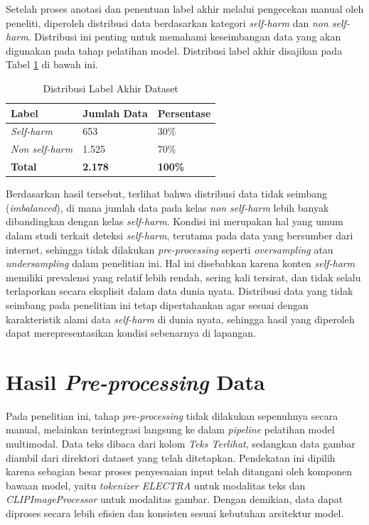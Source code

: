Setelah proses anotasi dan penentuan label akhir melalui pengecekan manual oleh peneliti, diperoleh distribusi data berdasarkan kategori \textit{self-harm} dan \textit{non self-harm}. Distribusi ini penting untuk memahami keseimbangan data yang akan digunakan pada tahap pelatihan model. Distribusi label akhir disajikan pada Tabel \ref{table:4.distribusi_label} di bawah ini.

\begin{table}[H]
    \centering
    \caption{Distribusi Label Akhir Dataset}
    \label{table:4.distribusi_label}
    \small
    \setlength{\tabcolsep}{3pt}
    \renewcommand{\arraystretch}{1.1}
    \begin{tabular}{p{4.5cm} p{3.5cm} p{3.5cm}}
        \hline
        \textbf{Label} & \textbf{Jumlah Data} & \textbf{Persentase} \\
        \hline
        \textit{Self-harm} & 653 & 30\% \\
        \textit{Non self-harm} & 1.525 & 70\% \\
        \textbf{Total} & \textbf{2.178} & \textbf{100\%} \\
        \hline
    \end{tabular}
\end{table}

Berdasarkan hasil tersebut, terlihat bahwa distribusi data tidak seimbang (\textit{imbalanced}), di mana jumlah data pada kelas \textit{non self-harm} lebih banyak dibandingkan dengan kelas \textit{self-harm}. Kondisi ini merupakan hal yang umum dalam studi terkait deteksi \textit{self-harm}, terutama pada data yang bersumber dari internet, sehingga tidak dilakukan \textit{pre-processing} seperti \textit{oversampling} atau \textit{undersampling} dalam penelitian ini. Hal ini disebabkan karena konten \textit{self-harm} memiliki prevalensi yang relatif lebih rendah, sering kali tersirat, dan tidak selalu terlaporkan secara eksplisit dalam data dunia nyata. Distribusi data yang tidak seimbang pada penelitian ini tetap dipertahankan agar sesuai dengan karakteristik alami data \textit{self-harm} di dunia nyata, sehingga hasil yang diperoleh dapat merepresentasikan kondisi sebenarnya di lapangan.

\section{Hasil \textit{Pre-processing} Data} \label{IV.Preprocessing}
Pada penelitian ini, tahap \textit{pre-processing} tidak dilakukan sepenuhnya secara manual, melainkan terintegrasi langsung ke dalam \textit{pipeline} pelatihan model multimodal. Data teks dibaca dari kolom \textit{Teks Terlihat}, sedangkan data gambar diambil dari direktori dataset yang telah ditetapkan. Pendekatan ini dipilih karena sebagian besar proses penyesuaian input telah ditangani oleh komponen bawaan model, yaitu \textit{tokenizer ELECTRA} untuk modalitas teks dan \textit{CLIPImageProcessor} untuk modalitas gambar. Dengan demikian, data dapat diproses secara lebih efisien dan konsisten sesuai kebutuhan arsitektur model.

